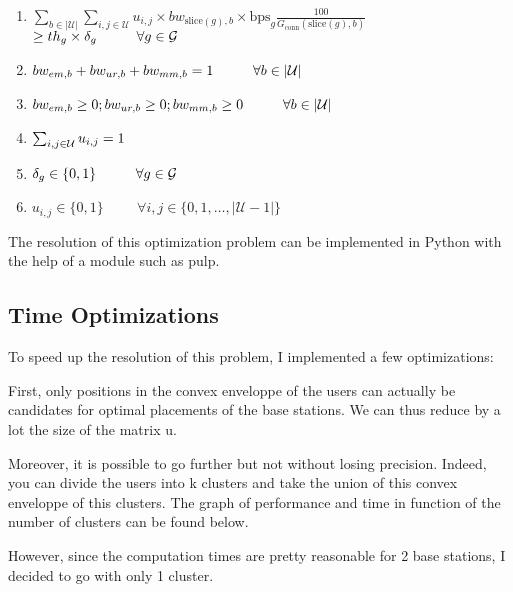 \documentclass[letterpaper]{article}
\begin{document}
\begin{multicols}{2}
\begin{enumerate}
    \item $\sum_{b \in |\mathcal{U}|} \sum_{i, j \in \mathcal{U}} u_{i, j} \times bw_{\text{slice}(g), b} \times \text{bps}_g \frac{100}{G_{\text{conn}}(\text{slice}(g),b)} \nonumber$
    $\geq th_g \times \delta_g \hspace{1cm} \forall g \in \mathcal{G} \\[1em]$
    \item $bw_{em,b} + bw_{ur,b} + bw_{mm,b} = 1 \hspace{1cm} \forall b \in |\mathcal{U}| \\[1em]$
    \item $bw_{em,b} \geq 0; bw_{ur,b} \geq 0; bw_{mm,b} \geq 0 \hspace{1cm} \forall b \in |\mathcal{U}| \\[1em]$
    \item $\sum_{i,j \in \mathcal{U}}u_{i,j} = 1 \\[1em]$
    \item $\delta_g \in \{0, 1\} \hspace{1cm} \forall g \in \mathcal{G} \\[1em] $
    \item $u_{i,j} \in \{0, 1\} \hspace{1cm} \forall i,j \in \{0, 1, \ldots , |\mathcal{U}-1|\}$
\end{enumerate}

The resolution of this optimization problem can be implemented in Python with the help of a module such as pulp.

\subsection{Time Optimizations}

To speed up the resolution of this problem, I implemented a few optimizations:

First, only positions in the convex enveloppe of the users can actually be candidates for optimal placements of the base stations.
We can thus reduce by a lot the size of the matrix u.

Moreover, it is possible to go further but not without losing precision.
Indeed, you can divide the users into k clusters and take the union of this convex enveloppe of this clusters.
The graph of performance and time in function of the number of clusters can be found below.

However, since the computation times are pretty reasonable for 2 base stations, I decided to go with only 1 cluster.


\end{multicols}
\end{document}
